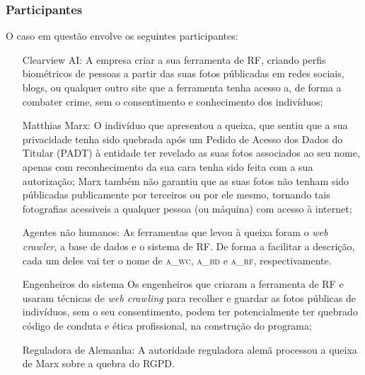 \documentclass[12pt]{../diazessay}
\begin{document}
\subsubsection*{Participantes}
O caso em questão envolve os seguintes participantes\parencite{first}: 
\begin{itemize}
  \item[Clearview AI:] A empresa criar a sua ferramenta de RF, criando perfis biométricos de pessoas a partir das suas fotos públicadas em redes sociais, blogs, ou qualquer outro site que a ferramenta tenha acesso a, de forma a combater crime, sem o consentimento e conhecimento dos indivíduos;
  \item[Matthias Marx:] O indivíduo que apresentou a queixa, que sentiu que a sua privacidade tenha sido quebrada após um Pedido de Acesso dos Dados do Titular (PADT) à entidade ter revelado as suas fotos associados ao seu nome, apenas com reconhecimento da sua cara tenha sido feita com a sua autorização; Marx também não garantiu que as suas fotos não tenham sido públicadas publicamente por terceiros ou por ele mesmo, tornando tais fotografias acessiveis a qualquer pessoa (ou máquina) com acesso à internet;
  \item[Agentes não humanos: ] As ferramentas que levou à queixa foram o \textit{web crawler}, a base de dados e o sistema de RF. De forma a facilitar a descrição, cada um deles vai ter o nome de \textsc{a\_wc}, \textsc{a\_bd} e \textsc{a\_rf}, respectivamente.
  \item[Engenheiros do sistema] Os engenheiros que criaram a ferramenta de RF e usaram técnicas de \textit{web crawling} para recolher e guardar as fotos públicas de indivíduos, sem o seu consentimento, podem ter potencialmente ter quebrado código de conduta e ética profissional, na construção do programa;
  \item[Reguladora de Alemanha:] A autoridade reguladora alemã processou a queixa de Marx sobre a quebra do RGPD.
\end{itemize}
\end{document}
